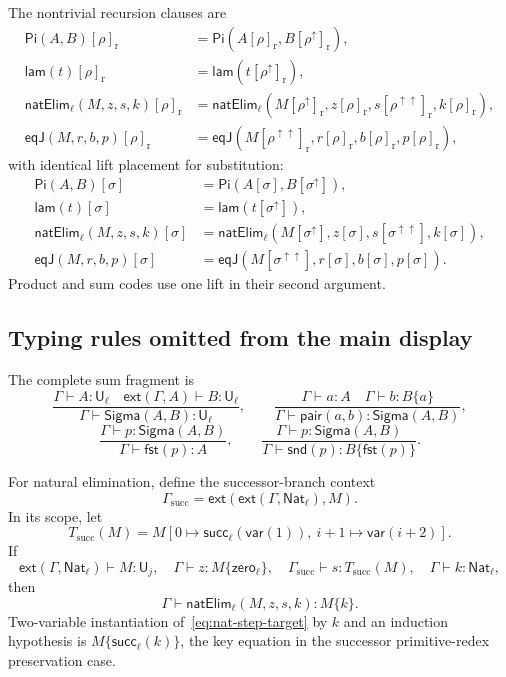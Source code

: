 \documentclass[10pt,reqno]{amsart}
\newcommand{\Ext}[2]{\mathsf{ext}(#1,#2)}
\newcommand{\Var}{\mathsf{var}}
\newcommand{\Sort}{\mathsf{U}}
\newcommand{\PiTy}{\mathsf{Pi}}
\newcommand{\SigmaTy}{\mathsf{Sigma}}
\newcommand{\Lam}{\mathsf{lam}}
\newcommand{\Pair}{\mathsf{pair}}
\newcommand{\Fst}{\mathsf{fst}}
\newcommand{\Snd}{\mathsf{snd}}
\newcommand{\NatTy}{\mathsf{Nat}}
\newcommand{\Zero}{\mathsf{zero}}
\newcommand{\Succ}{\mathsf{succ}}
\newcommand{\NatElim}{\mathsf{natElim}}
\newcommand{\EqJ}{\mathsf{eqJ}}
\newcommand{\lift}{\uparrow}
\begin{document}
The nontrivial recursion clauses are
\[
\begin{aligned}
\PiTy(A,B)[\rho]_{\mathrm r}
 &=\PiTy(A[\rho]_{\mathrm r},B[\rho^\lift]_{\mathrm r}),\\
\Lam(t)[\rho]_{\mathrm r}
 &=\Lam(t[\rho^\lift]_{\mathrm r}),\\
\NatElim_\ell(M,z,s,k)[\rho]_{\mathrm r}
 &=\NatElim_\ell(M[\rho^\lift]_{\mathrm r},
    z[\rho]_{\mathrm r},s[\rho^{\lift\lift}]_{\mathrm r},
    k[\rho]_{\mathrm r}),\\
\EqJ(M,r,b,p)[\rho]_{\mathrm r}
 &=\EqJ(M[\rho^{\lift\lift}]_{\mathrm r},
    r[\rho]_{\mathrm r},b[\rho]_{\mathrm r},p[\rho]_{\mathrm r}),
\end{aligned}
\]
with identical lift placement for substitution:
\[
\begin{aligned}
\PiTy(A,B)[\sigma]
 &=\PiTy(A[\sigma],B[\sigma^\lift]),\\
\Lam(t)[\sigma]&=\Lam(t[\sigma^\lift]),\\
\NatElim_\ell(M,z,s,k)[\sigma]
 &=\NatElim_\ell(M[\sigma^\lift],z[\sigma],
     s[\sigma^{\lift\lift}],k[\sigma]),\\
\EqJ(M,r,b,p)[\sigma]
 &=\EqJ(M[\sigma^{\lift\lift}],r[\sigma],
        b[\sigma],p[\sigma]).
\end{aligned}
\tag{A.2}\label{eq:binder-clauses}
\]
Product and sum codes use one lift in their second argument.

\subsection{Typing rules omitted from the main display}

The complete sum fragment is
\[
\frac{\Gamma\vdash A:\Sort_\ell\quad
      \Ext{\Gamma}{A}\vdash B:\Sort_\ell}
     {\Gamma\vdash\SigmaTy(A,B):\Sort_\ell},
\qquad
\frac{\Gamma\vdash a:A\quad\Gamma\vdash b:B\{a\}}
     {\Gamma\vdash\Pair(a,b):\SigmaTy(A,B)},
\]
\[
\frac{\Gamma\vdash p:\SigmaTy(A,B)}
     {\Gamma\vdash\Fst(p):A},
\qquad
\frac{\Gamma\vdash p:\SigmaTy(A,B)}
     {\Gamma\vdash\Snd(p):B\{\Fst(p)\}}.
\tag{A.3}\label{eq:sigma-rules}
\]

For natural elimination, define the successor-branch context
\[
 \Gamma_{\mathrm{succ}}
   =\Ext{\Ext{\Gamma}{\NatTy_\ell}}{M}.
\]
In its scope, let
\[
 T_{\mathrm{succ}}(M)
   =M[
      0\mapsto\Succ_\ell(\Var(1)),\
      i+1\mapsto\Var(i+2)
     ].
\tag{A.4}\label{eq:nat-step-target}
\]
If
\[
\Ext{\Gamma}{\NatTy_\ell}\vdash M:\Sort_j,\quad
\Gamma\vdash z:M\{\Zero_\ell\},\quad
\Gamma_{\mathrm{succ}}\vdash s:T_{\mathrm{succ}}(M),\quad
\Gamma\vdash k:\NatTy_\ell,
\]
then
\[
\Gamma\vdash\NatElim_\ell(M,z,s,k):M\{k\}.
\tag{A.5}\label{eq:nat-elim-full}
\]
Two-variable instantiation of~\eqref{eq:nat-step-target} by \(k\) and an
induction hypothesis is \(M\{\Succ_\ell(k)\}\), the key equation in the
successor primitive-redex preservation case.
\end{document}
